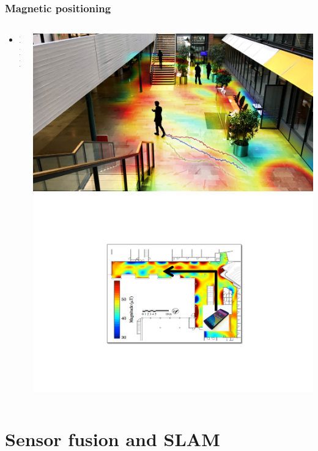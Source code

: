 \documentclass[xcolor=svgnames,english,handout]{beamer}
\begin{document}
\begin{frame}
  \frametitle{Magnetic positioning}

  \begin{columns}
  \begin{column}{0.6\textwidth}
  \begin{itemize}[<+->]       
  \item XXX
  \end{itemize}
  \end{column}
  \begin{column}{0.4\textwidth}
  \includegraphics[width=\columnwidth]{terrain-matching} \\
  \includegraphics[width=\columnwidth]{magnetic}
  \end{column}
  \end{columns}
\end{frame}

\section{Sensor fusion and SLAM}
\end{document}
